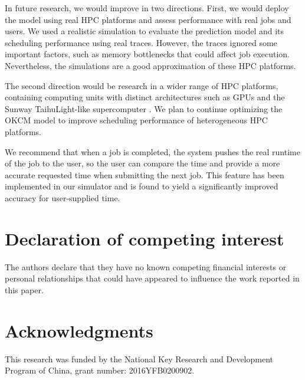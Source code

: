 \documentclass[a4paper,fleqn]{cas-sc}
\begin{document}
In future research, we would improve in two directions. First, we would deploy the model using real HPC platforms and assess performance with real jobs and users. We used a realistic simulation to evaluate the prediction model and its scheduling performance using real traces. However, the traces ignored some important factors, such as memory bottlenecks that could affect job execution. Nevertheless, the simulations are a good approximation of these HPC platforms.

The second direction would be research in a wider range of HPC platforms, containing computing units with distinct architectures such as GPUs \cite{22GPU} and the Sunway TaihuLight-like supercomputer \cite{23Lijingbo}. We plan to continue optimizing the OKCM model to improve scheduling performance of heterogeneous HPC platforms. 

We recommend that when a job is completed, the system pushes the real runtime of the job to the user, so the user can compare the time and provide a more accurate requested time when submitting the next job. This feature has been implemented in our simulator and is found to yield a significantly improved accuracy for user-supplied time.

\section{Declaration of competing interest}
The authors declare that they have no known competing financial interests or personal relationships that could have appeared to influence the work reported in this paper.

\section{Acknowledgments}
This research was funded by the National Key Research and Development Program of China, grant number: 2016YFB0200902.


%
%
%




\end{document}
